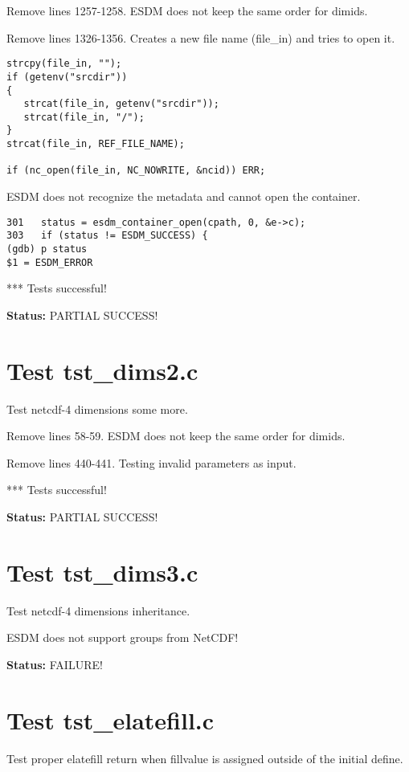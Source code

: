 Remove lines 1257-1258. ESDM does not keep the same order for dimids.

Remove lines 1326-1356. Creates a new file name (file\_in) and tries to open it.

\begin{verbatim}
strcpy(file_in, "");
if (getenv("srcdir"))
{
   strcat(file_in, getenv("srcdir"));
   strcat(file_in, "/");
}
strcat(file_in, REF_FILE_NAME);

if (nc_open(file_in, NC_NOWRITE, &ncid)) ERR;
\end{verbatim}

ESDM does not recognize the metadata and cannot open the container.

\begin{verbatim}
301	  status = esdm_container_open(cpath, 0, &e->c);
303	  if (status != ESDM_SUCCESS) {
(gdb) p status
$1 = ESDM_ERROR
\end{verbatim}

*** Tests successful!

{\bf \large Status: } PARTIAL SUCCESS!

\section{Test tst\_dims2.c}

Test netcdf-4 dimensions some more.

Remove lines 58-59. ESDM does not keep the same order for dimids.

Remove lines 440-441. Testing invalid parameters as input.

*** Tests successful!

{\bf \large Status: } PARTIAL SUCCESS!

\section{Test tst\_dims3.c}

Test netcdf-4 dimensions inheritance.

ESDM does not support groups from NetCDF!

{\bf \large Status: } FAILURE!

\section{Test tst\_elatefill.c}

Test proper elatefill return when fillvalue is assigned outside of
the initial define.

